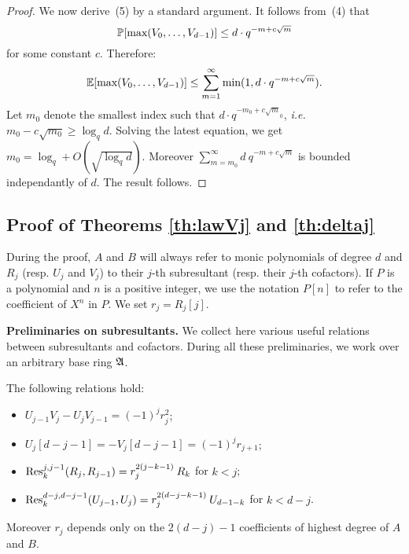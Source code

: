 \documentclass{article}
\begin{document}
\begin{proof}
We now derive~(5) by a standard argument. It follows from~(4) that
$$\P[\max(V_0, \ldots, V_{d-1})] \leq d \cdot q^{-m + c\sqrt m}$$
for some constant $c$. Therefore:
$$\E[\max(V_0, \ldots, V_{d-1})] \leq \sum_{m=1}^\infty \min(1,
d \cdot q^{-m + c\sqrt m}).$$
Let $m_0$ denote the smallest index such that $d \cdot q^{-m_0 + c\sqrt 
m_0}$, \emph{i.e.} $m_0 - c \sqrt{m_0} \geq \log_q d$. Solving the latest
equation, we get $m_0 = \log_q + O(\sqrt{\log_q d})$. Moreover
$\sum_{m=m_0}^\infty d\: q^{-m + c\sqrt m}$ is bounded independantly of
$d$. The result follows.
\end{proof}

\subsection{Proof of Theorems \ref{th:lawVj} and \ref{th:deltaj}}
\label{subsec:proof}

During the proof, $A$ and $B$ will always refer to monic polynomials of 
degree $d$ and $R_j$ (resp. $U_j$ and $V_j$) to their $j$-th 
subresultant (resp. their $j$-th cofactors). If $P$ is a polynomial and 
$n$ is a positive integer, we use the notation $P[n]$ to refer to the 
coefficient of $X^n$ in $P$. We set $r_j = R_j[j]$.

\medskip

\noindent
\textbf{Preliminaries on subresultants.}
We collect here various useful relations between subresultants and 
cofactors. During all these preliminaries, we work over an arbitrary
base ring $\ring$.

\begin{prop}
\label{prop:relations}
The following relations hold:
\begin{itemize}
\setlength\itemsep{0.1em}
\item $U_{j-1} V_j - U_j V_{j-1} = (-1)^j r_j^2$;
\item $U_j[d{-}j{-}1] = -V_j[d{-}j{-}1] = (-1)^j r_{j+1}$;
\item $\Res^{j,j-1}_k(R_j, R_{j-1}) = r_j^{2(j-k-1)} \: R_k$ for $k < j$;
\item $\Res^{d-j,d-j-1}_k(U_{j-1}, U_j) = r_j^{2(d-j-k-1)} \: U_{d-1-k}$
for $k < d-j$.
\end{itemize}
Moreover $r_j$ depends only on the $2(d-j)-1$ coefficients of highest 
degree of $A$ and $B$.
\end{prop}
\end{document}
